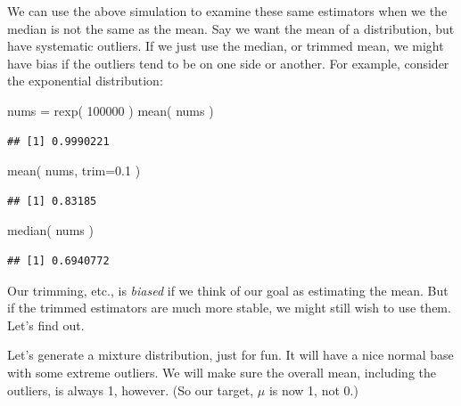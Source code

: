 \documentclass[
]{book}
\newenvironment{Shaded}{\begin{snugshade}}{\end{snugshade}}
\newcommand{\AttributeTok}[1]{\textcolor[rgb]{0.77,0.63,0.00}{#1}}
\newcommand{\DecValTok}[1]{\textcolor[rgb]{0.00,0.00,0.81}{#1}}
\newcommand{\FloatTok}[1]{\textcolor[rgb]{0.00,0.00,0.81}{#1}}
\newcommand{\FunctionTok}[1]{\textcolor[rgb]{0.00,0.00,0.00}{#1}}
\newcommand{\NormalTok}[1]{#1}
\newcommand{\OtherTok}[1]{\textcolor[rgb]{0.56,0.35,0.01}{#1}}
\begin{document}
We can use the above simulation to examine these same estimators when we the
median is not the same as the mean. Say we want the mean of a distribution,
but have systematic outliers. If we just use the median, or trimmed mean, we
might have bias if the outliers tend to be on one side or another. For
example, consider the exponential distribution:

\begin{Shaded}
\begin{Highlighting}[]
\NormalTok{nums }\OtherTok{=} \FunctionTok{rexp}\NormalTok{( }\DecValTok{100000}\NormalTok{ )}
\FunctionTok{mean}\NormalTok{( nums )}
\end{Highlighting}
\end{Shaded}

\begin{verbatim}
## [1] 0.9990221
\end{verbatim}

\begin{Shaded}
\begin{Highlighting}[]
\FunctionTok{mean}\NormalTok{( nums, }\AttributeTok{trim=}\FloatTok{0.1}\NormalTok{ )}
\end{Highlighting}
\end{Shaded}

\begin{verbatim}
## [1] 0.83185
\end{verbatim}

\begin{Shaded}
\begin{Highlighting}[]
\FunctionTok{median}\NormalTok{( nums )}
\end{Highlighting}
\end{Shaded}

\begin{verbatim}
## [1] 0.6940772
\end{verbatim}

Our trimming, etc., is \emph{biased} if we think of our goal as estimating the
mean. But if the trimmed estimators are much more stable, we might still
wish to use them. Let's find out.

Let's generate a mixture distribution, just for fun. It will have a nice
normal base with some extreme outliers. We will make sure the overall mean,
including the outliers, is always 1, however. (So our target, \(\mu\) is now 1,
not 0.)
\end{document}
